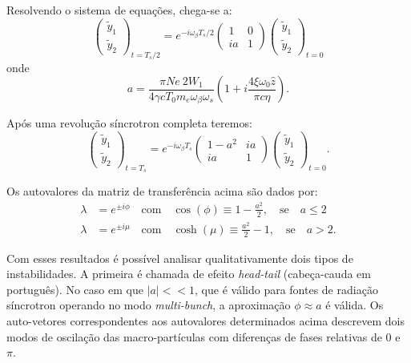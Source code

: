 Resolvendo o sistema de equações, chega-se a:
\begin{equation}
\left(\begin{array}{c}\tilde{y}_1 \\ \tilde{y}_2 \end{array} \right)_{t=T_s/2}
=  e^{-i\omega_\beta T_s/2} 
\left(\begin{array}{cc} 1 & 0 \\ ia & 1 \end{array}\right)
\left(\begin{array}{c}\tilde{y}_1 \\ \tilde{y}_2 \end{array} \right)_{t=0}
\end{equation}
onde
\begin{equation}
 a = \frac{\pi N e~2 W_1}{4\gamma c T_0 m_e \omega_\beta \omega_s}\left(
1+i\frac{4 \xi \omega_0 \hat{z}}{\pi c \eta}\right).
\end{equation}

Após uma revolução síncrotron completa teremos:
\begin{equation}
\left(\begin{array}{c}\tilde{y}_1 \\ \tilde{y}_2 \end{array} \right)_{t=T_s}
=  e^{-i\omega_\beta T_s} 
\left(\begin{array}{cc} 1-a^2 & ia \\ ia & 1 \end{array}\right)
\left(\begin{array}{c}\tilde{y}_1 \\ \tilde{y}_2 \end{array} \right)_{t=0}.
\end{equation}

Os autovalores da matriz de transferência acima são dados por:
\begin{align}
 \lambda &= e^{\pm i\phi}\quad \text{com} \quad \cos(\phi) \equiv
1-\frac{a^2}{2}, \quad \text{se} \quad a\leq 2 \\
 \lambda &= e^{\pm i\mu}\quad \text{com} \quad \cosh(\mu) \equiv \frac{a^2}{2}
- 1, \quad \text{se} \quad a > 2.
\end{align}

Com esses resultados é possível analisar qualitativamente dois tipos de instabilidades. A primeira é chamada de efeito \textit{head-tail} (cabeça-cauda em português). No caso em que $|a| << 1$, que é válido para fontes de radiação síncrotron operando no modo \textit{multi-bunch}, a aproximação $\phi \approx a$ é válida. Os auto-vetores correspondentes aos autovalores determinados acima descrevem dois modos de oscilação das macro-partículas com diferenças de fases relativas de 0 e $\pi$.

